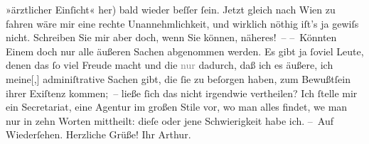 \begin{ledgroupsized}[t]{13cm}
                    »ärztlicher Einſicht« her) bald {\pb}wieder beſſer
                    ſein. Jetzt gleich nach Wien zu fahren wäre
                    mir eine rechte Unannehmlichkeit, und wirklich nöthig iſt’s ja gewiſs nicht.
                    Schreiben Sie mir aber doch, wenn Sie können, näheres! –\pend
           \pstart
           – Könnten Einem doch nur alle äußeren Sachen abgenommen werden. Es gibt ja ſoviel
                    Leute, denen das ſo viel Freude macht und die \textcolor{gray}{nur} dadurch,
                    daß ich es äußere, ich {\pb}meine{[},{]} adminiſtrative Sachen gibt, die ſie zu
                    beſorgen haben, zum Bewußtſein ihrer Exiſtenz kommen; – ließe ſich das
                    nicht irgendwie vertheilen? Ich ſtelle mir ein Secretariat, eine Agentur im
                    großen Stile vor, wo man alles findet, we{\geminationn} man nur
                    in zehn Worten mittheilt: dieſe oder jene Schwierigkeit habe ich.\pend
           \pstart – Auf Wiederſehen. Herzliche Grüße! Ihr \spacefill\mbox{Arthur.}\pend{}\endnumbering{}\end{ledgroupsized}  \newcommand{\dateiname}{L00698}\newcommand{\titel}{Arthur Schnitzler an Hugo von Hofmannsthal, 9. 7. 1897}\newcommand{\editorInnen}{Martin Anton Müller und Gerd-Hermann Susen}
      